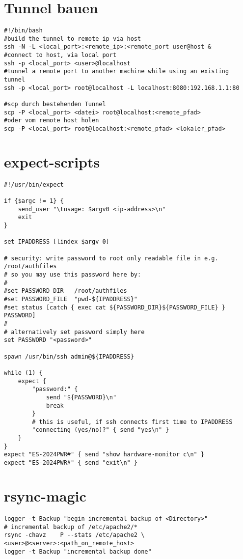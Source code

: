 \documentclass[a4paper,10pt]{report}
\begin{document}
\section{Tunnel bauen}
\begin{verbatim}
#!/bin/bash
#build the tunnel to remote_ip via host
ssh -N -L <local_port>:<remote_ip>:<remote_port user@host &
#connect to host, via local port
ssh -p <local_port> <user>@localhost
#tunnel a remote port to another machine while using an existing tunnel
ssh -p <local_port> root@localhost -L localhost:8080:192.168.1.1:80

#scp durch bestehenden Tunnel
scp -P <local_port> <datei> root@localhost:<remote_pfad>
#oder vom remote host holen
scp -P <local_port> root@localhost:<remote_pfad> <lokaler_pfad>

\end{verbatim}

\section{expect-scripts}
\begin{verbatim}
#!/usr/bin/expect

if {$argc != 1} {
    send_user "\tusage: $argv0 <ip-address>\n"
    exit
}

set IPADDRESS [lindex $argv 0]

# security: write password to root only readable file in e.g. /root/authfiles
# so you may use this password here by:
#
#set PASSWORD_DIR   /root/authfiles
#set PASSWORD_FILE  "pwd-${IPADDRESS}"
#set status [catch { exec cat ${PASSWORD_DIR}${PASSWORD_FILE} } PASSWORD]
#
# alternatively set password simply here
set PASSWORD "<password>"

spawn /usr/bin/ssh admin@${IPADDRESS}

while (1) {
    expect {
        "password:" {			
            send "${PASSWORD}\n"
            break
        }
        # this is useful, if ssh connects first time to IPADDRESS
        "connecting (yes/no)?" { send "yes\n" }
    }
}
expect "ES-2024PWR#" { send "show hardware-monitor c\n" }
expect "ES-2024PWR#" { send "exit\n" }

\end{verbatim}

\section{rsync-magic}
\begin{verbatim}
logger -t Backup "begin incremental backup of <Directory>"
# incremental backup of /etc/apache2/*
rsync -chavz	P --stats /etc/apache2 \
<user>@<server>:<path_on_remote_host>
logger -t Backup "incremental backup done"
\end{verbatim}
\pagebreak
\end{document}

